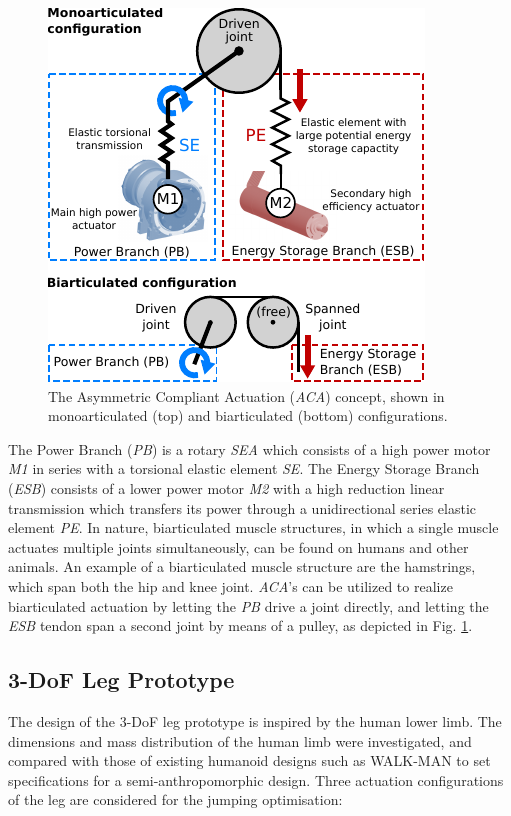 \documentclass[letterpaper, 10 pt, conference]{ieeeconf}  %
\begin{document}
\begin{figure}[b]
	\centering
	\includegraphics[width=0.8\linewidth]{actuationConcept}
	\caption{The Asymmetric Compliant Actuation (\textit{ACA}) concept, shown in monoarticulated (top) and biarticulated (bottom) configurations.}
	\label{fig:ACA}
\end{figure}

The Power Branch (\textit{PB}) is a rotary \textit{SEA} which consists of a high power motor \textit{M1} in series with a torsional elastic element \textit{SE}. The Energy Storage Branch (\textit{ESB}) consists of a lower power motor \textit{M2} with a high reduction linear transmission which transfers its power through a unidirectional series elastic element \textit{PE}.
In nature, biarticulated muscle structures, in which a single muscle actuates multiple joints simultaneously, can be found on humans and other animals. An example of a biarticulated muscle structure are the hamstrings, which span both the hip and knee joint. \textit{ACA}'s can be utilized to realize biarticulated actuation by letting the \textit{PB} drive a joint directly, and letting the \textit{ESB} tendon span a second joint by means of a pulley, as depicted in Fig. \ref{fig:ACA}.

\subsection{3-DoF Leg Prototype}
The design of the 3-DoF leg prototype is inspired by the human lower limb. The dimensions and mass distribution of the human limb were investigated, and compared with those of existing humanoid designs such as WALK-MAN \cite{tsagarakis2017walk} to set specifications for a semi-anthropomorphic design. 
Three actuation configurations of the leg are considered for the jumping optimisation:
\end{document}
